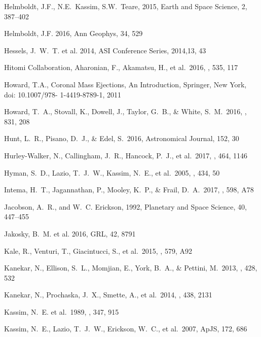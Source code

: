 \documentclass[11pt]{article}
\begin{document}
\begin{thebibliography}{}
 Helmboldt, J.F., N.E.\ Kassim, S.W.\ Teare, 2015, Earth and Space Science, 2, 387--402

Helmboldt, J.F. 2016, Ann Geophys, 34, 529 

 Hessels, J.~W.~T. et al. 2014, ASI Conference Series, 2014,13, 43

 Hitomi Collaboration, Aharonian, F., Akamatsu, H., et al.\ 2016, \nat, 535, 117 


 Howard, T.A., Coronal Mass Ejections, An Introduction, Springer, New York, doi: 10.1007/978-
1-4419-8789-1, 2011

 Howard, T.~A., Stovall, K., Dowell, J., Taylor, G.~B., \& White, S.~M.\ 2016, \apj, 831, 208 

 Hunt, L.~R., Pisano, D.~J., \& Edel, S.\ 2016, Astronomical Journal, 152, 30 

 Hurley-Walker, N., Callingham, J.~R., Hancock, P.~J., et al.\ 2017, \mnras, 464, 1146 

 Hyman, S.~D., Lazio, T.~J.~W., Kassim, N.~E., et al.\ 2005, \nat, 434, 50

 Intema, H.~T., Jagannathan, P., Mooley, K.~P., \& Frail, D.~A.\ 2017, \aap, 598, A78 

 {Jacobson}, A.~R., and W.~C. {Erickson}, 1992, Planetary and Space Science, 40,
  447--455

Jakosky, B.~M. et al. 2016, GRL, 42, 8791

 Kale, R., Venturi, T., Giacintucci, S., et al.\ 2015, \aap, 579, A92 

 Kanekar, N., Ellison, S.~L., Momjian, E., York, B.~A., \& Pettini, M.\ 2013, \mnras, 428, 532 

 Kanekar, N., Prochaska, J.~X., Smette, A., et al.\ 2014, \mnras, 438, 2131 

 Kassim, N.~E. et al.\ 1989, \apj, 347, 915 

 Kassim, N.~E., Lazio, T.~J.~W., Erickson, W.~C., et al.\ 2007, ApJS, 172, 686 


\end{thebibliography}
\end{document}
